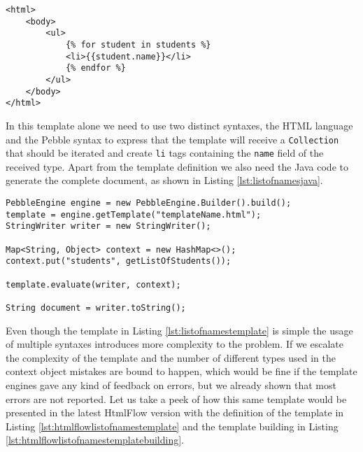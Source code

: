 \begin{minipage}{\linewidth}
\begin{lstlisting}[caption={List of Student Names Template using Pebble}, label={lst:listofnamestemplate}]
<html>
	<body>
	    <ul>
			{% for student in students %}
		  	<li>{{student.name}}</li>
			{% endfor %}
		</ul>  
  	</body>
</html>
\end{lstlisting}
\end{minipage} 

\noindent
In this template alone we need to use two distinct syntaxes, the \ac{HTML} language and the Pebble syntax to express that the template will receive a \texttt{Collection} that should be iterated  and create \texttt{li} tags containing the \texttt{name} field of the received type. Apart from the template definition we also need the Java code to generate the complete document, as shown in Listing \ref{lst:listofnamesjava}.

\bigskip


\begin{minipage}{\linewidth}
\begin{lstlisting}[caption={List of Student Names building in Java using Pebble}, label={lst:listofnamesjava}]
PebbleEngine engine = new PebbleEngine.Builder().build();
template = engine.getTemplate("templateName.html");
StringWriter writer = new StringWriter();

Map<String, Object> context = new HashMap<>();
context.put("students", getListOfStudents());

template.evaluate(writer, context);

String document = writer.toString();
\end{lstlisting}
\end{minipage} 

\noindent
Even though the template in Listing \ref{lst:listofnamestemplate} is simple the usage of multiple syntaxes introduces more complexity to the problem. If we escalate the complexity of the template and the number of different types used in the context object mistakes are bound to happen, which would be fine if the template engines gave any kind of feedback on errors, but we already shown that most errors are not reported. Let us take a peek of how this same template would be presented in the latest HtmlFlow version with the definition of the template in Listing \ref{lst:htmlflowlistofnamestemplate} and the template building in Listing \ref{lst:htmlflowlistofnamestemplatebuilding}.

